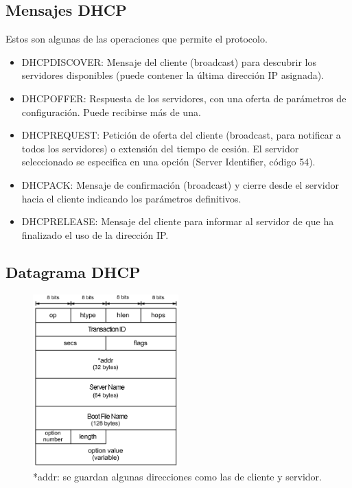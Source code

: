 \subsection{Mensajes DHCP}
Estos son algunas de las operaciones que permite el protocolo.
\begin{itemize}
    \item DHCPDISCOVER: Mensaje del cliente (broadcast) para descubrir los servidores disponibles (puede contener la última dirección IP asignada).
    \item DHCPOFFER: Respuesta de los servidores, con una oferta de parámetros de configuración. Puede
    recibirse más de una.
    \item DHCPREQUEST: Petición de oferta del cliente (broadcast, para notificar a todos los servidores) o extensión del tiempo de cesión. El servidor seleccionado se especifica en una opción (Server Identifier, código 54).
    \item DHCPACK: Mensaje de confirmación (broadcast) y cierre desde el servidor hacia el cliente indicando los parámetros definitivos.
    \item DHCPRELEASE: Mensaje del cliente para informar al servidor de que ha finalizado el uso de
    la dirección IP.
\end{itemize}
\subsection{Datagrama DHCP}
\begin{figure}[H]
    \centering
    \includegraphics[width=0.5\textwidth]{img/DHCPformat.jpg}
    \caption{*addr: se guardan algunas direcciones como las de cliente y servidor.}
\end{figure}
\newpage
